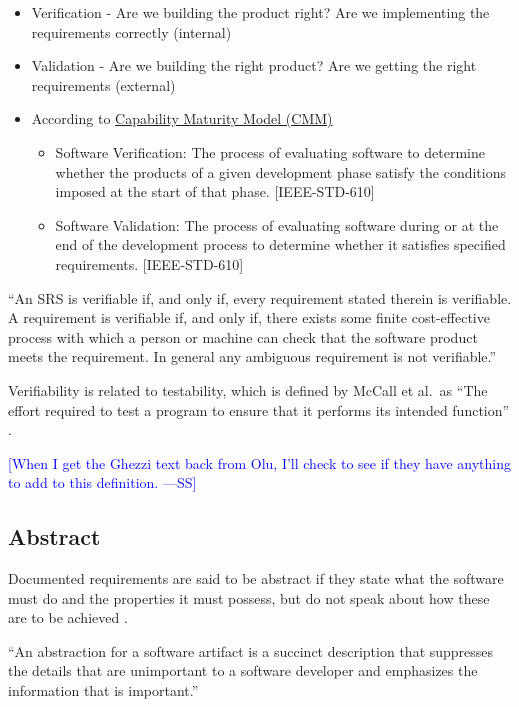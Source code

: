 \documentclass[letterpaper,cleveref]{lipics-v2019}
\newcommand{\authornote}[3]{\textcolor{#1}{[#3 ---#2]}}
\newcommand{\authornote}[3]{}
\newcommand{\wss}[1]{\authornote{blue}{SS}{#1}} %
\theoremstyle{definition}
\begin{document}
\begin{itemize}

\item Verification - Are we building the product right?  Are we implementing the
  requirements correctly (internal)
\item Validation - Are we building the right product? Are we getting the right
  requirements (external)
\item According to
  \href{https://en.wikipedia.org/wiki/Software_verification_and_validation}{Capability
    Maturity Model (CMM)}
\begin{itemize}
\item 
    Software Verification: The process of evaluating software to determine
    whether the products of a given development phase satisfy the conditions
    imposed at the start of that phase. [IEEE-STD-610]
  \item Software Validation: The process of evaluating software during or at the
    end of the development process to determine whether it satisfies specified
    requirements. [IEEE-STD-610] 
\end{itemize}
\end{itemize}

``An SRS is verifiable if, and only if, every requirement stated therein is
verifiable. A requirement is verifiable if, and only if, there exists some
finite cost-effective process with which a person or machine can check that the
software product meets the requirement. In general any ambiguous requirement is
not verifiable.'' \citep{IEEE1998}

Verifiability is related to testability, which is defined by McCall et al.\ as
``The effort required to test a program to ensure that it performs its intended
function'' \cite{VanVliet2000}.  

\wss{When I get the Ghezzi text back from Olu,
  I'll check to see if they have anything to add to this definition.}

\subsection{Abstract}

Documented requirements are said to be abstract if they state what the software
must do and the properties it must possess, but do not speak about how these are
to be achieved \citep{GhezziEtAl2003}.  

``An abstraction for a software artifact is a succinct description that suppresses
the details that are unimportant to a software developer and emphasizes the
information that is important.'' \cite{Krueger1992}
\end{document}
